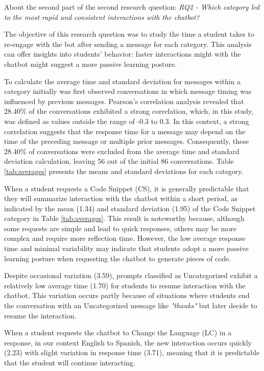 \documentclass[a4paper,twoside]{article}
\begin{document}
About the second part of the second research question: \textit{RQ2 - Which
category led to the most rapid and consistent interactions with the chatbot?}

The objective of this research question was to study the time a student takes to
re-engage with the bot after sending a message for each category. This analysis
can offer insights into students' behavior: faster interactions might with the
chatbot might suggest a more passive learning posture.

To calculate the average time and standard deviation for messages within a
category initially was first observed conversations in which message timing was
influenced by previous messages. Pearson's correlation analysis revealed that
28.40\% of the conversations exhibited a strong correlation, which, in this
study, was defined as values outside the range of -0.3 to 0.3. In this context,
a strong correlation suggests that the response time for a message may depend
on the time of the preceding message or multiple prior messages. Consequently,
these 28.40\% of conversations were excluded from the average time and standard
deviation calculation, leaving 56 out of the initial 86 conversations. Table
\ref{tab:averages} presents the means and standard deviations for each category.

When a student requests a Code Snippet (CS), it is generally predictable that
they will summarize interaction with the chatbot within a short period, as
indicated by the mean (1.34) and standard deviation (1.95) of the Code Snippet
category in Table \ref{tab:averages}. This result is noteworthy because,
although some requests are simple and lead to quick responses, others may be
more complex and require more reflection time. However, the low average response
time and minimal variability may indicate that students adopt a more passive
learning posture when requesting the chatbot to generate pieces of code.

Despite occasional variation (3.59), prompts classified as Uncategorized exhibit
a relatively low average time (1.70) for students to resume interaction with the
chatbot. This variation occurs partly because of situations where students end
the conversation with an Uncategorized message like \textit{"thanks"} but later
decide to resume the interaction.

When a student requests the chatbot to Change the Language (LC)  in a response,
in our context English to Spanish, the new interaction occurs quickly (2.23)
with slight variation in response time (3.71), meaning that it is predictable
that the student will continue interacting.
\end{document}
